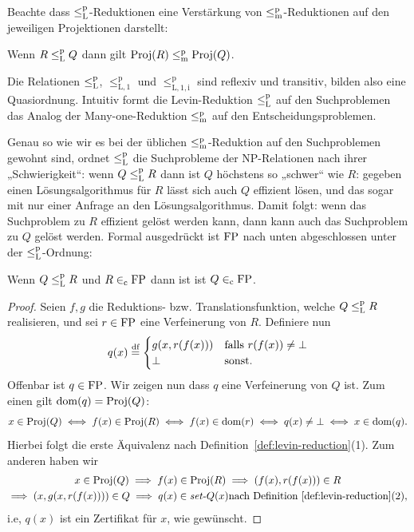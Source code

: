 Beachte dass $\leq_\mathrm{L}^\mathrm{p}$-Reduktionen eine Verstärkung von $\leq_\mathrm{m}^\mathrm{p}$-Reduktionen auf den jeweiligen Projektionen darstellt:
\begin{observation}
    Wenn $R\leq_\mathrm{L}^\mathrm{p} Q$ dann gilt $\operatorname{Proj}(R)\leq_\mathrm{m}^\mathrm{p} \operatorname{Proj}(Q)$.
\end{observation}


Die Relationen $\leq_\mathrm{L}^\mathrm{p}$, $\leq_\mathrm{L,1}^\mathrm p$ und $\leq_\mathrm{L,1,i}^\mathrm p$ sind reflexiv und transitiv, bilden also eine Quasiordnung.
Intuitiv formt die Levin-Reduktion $\leq_\mathrm{L}^\mathrm{p}$ auf den Suchproblemen das Analog der Many-one-Reduktion $\leq_\mathrm{m}^\mathrm{p}$ auf den Entscheidungsproblemen.

Genau so wie wir es bei der üblichen $\leq_\mathrm{m}^\mathrm{p}$-Reduktion auf den Suchproblemen gewohnt sind, ordnet $\leq_\mathrm{L}^\mathrm{p}$ die Suchprobleme der NP-Relationen nach ihrer „Schwierigkeit“: wenn $Q\leq_\mathrm{L}^\mathrm{p} R$ dann ist $Q$ höchstens so „schwer“ wie $R$:  gegeben einen Lösungsalgorithmus für $R$ lässt sich auch $Q$ effizient lösen, und das sogar mit nur einer Anfrage an den Lösungsalgorithmus. Damit folgt: wenn das Suchproblem zu $R$ effizient gelöst werden kann, dann kann auch das Suchproblem zu $Q$ gelöst werden.
Formal ausgedrückt ist $\mathrm{FP}$ nach unten abgeschlossen unter der $\leq_\mathrm{L}^\mathrm{p}$-Ordnung:

\begin{lemma}
    Wenn $Q\leq_\mathrm{L}^\mathrm{p} R$ und $R\in_\mathrm{c}\mathrm{FP}$ dann ist ist $Q\in_\mathrm{c} \mathrm{FP}$.
\end{lemma}
\begin{proof}
    Seien $f,g$ die Reduktions- bzw. Translationsfunktion, welche $Q\leq_\mathrm{L}^\mathrm{p} R$ realisieren, und sei $r\in\mathrm{FP}$ eine Verfeinerung von $R$.
    Definiere nun
    \[ q(x) \stackrel{\text{df}}{=} \begin{cases} g(x, r(f(x))) & \text{falls $r(f(x))\neq \bot$} \\ \bot & \text{sonst}.\end{cases} \]
    Offenbar ist $q\in\mathrm{FP}$. Wir zeigen nun dass $q$ eine Verfeinerung von $Q$ ist.
    Zum einen gilt $\operatorname{dom}(q)=\operatorname{Proj}(Q)$:
    \[ x\in\operatorname{Proj}(Q) \iff f(x)\in\operatorname{Proj}(R) \iff f(x)\in\operatorname{dom}(r) \iff q(x)\neq\bot \iff x\in\operatorname{dom}(q). \]
    Hierbei folgt die erste Äquivalenz nach Definition~\ref{def:levin-reduction}(1).
    Zum anderen haben wir
    \begin{gather*}
        x\in\operatorname{Proj}(Q) \implies f(x)\in\operatorname{Proj}(R) \implies (f(x), r(f(x)))\in R\\ \implies (x, g(x, r(f(x))))\in Q \implies q(x)\in\mathit{set}\text{-}{}Q(x) \text{nach Definition~\ref{def:levin-reduction}(2)},
    \end{gather*}
    i.e, $q(x)$ ist ein Zertifikat für $x$, wie gewünscht.
\end{proof}

